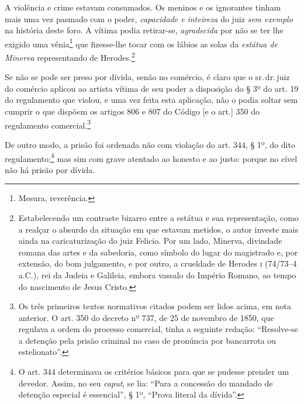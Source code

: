 A violência e crime estavam consumados. Os meninos e os ignorantes
tinham mais uma vez pasmado com o poder, \emph{capacidade e}
\emph{inteireza} do juiz \emph{sem exemplo} na história deste foro. A
vítima podia retirar-se, \emph{agradecida} por não se ter lhe exigido
uma vênia\footnote{ Mesura, reverência.} que fizesse-lhe tocar com os
lábios as solas da \emph{estátua de Minerva} representando de
Herodes.\footnote{ Estabelecendo um contraste bizarro entre a estátua e
  sua representação, como a realçar o absurdo da situação em que estavam
  metidos, o autor investe mais ainda na caricaturização do juiz
  Felicio. Por um lado, Minerva, divindade romana das artes e da
  sabedoria, como símbolo do lugar do magistrado e, por extensão, do bom
  julgamento, e por outro, a crueldade de Herodes \textsc{i} (74/73--4\,
  a.C.), rei da Judeia e Galileia, embora vassalo do Império Romano, ao
  tempo do nascimento de Jesus Cristo.}

Se não se pode ser preso por dívida, senão no comércio, é claro que o
sr.\,dr.\,juiz do comércio aplicou ao artista vítima de seu poder a
disposição do § 3º do art. 19 do regulamento que violou, e uma vez feita
esta aplicação, não o podia soltar sem cumprir o que dispõem os artigos
806 e 807 do Código {[}e o art.{]} 350 do regulamento
comercial.\footnote{ Os três primeiros textos normativos citados podem
  ser lidos acima, em nota anterior. O art. 350 do decreto nº 737, de
  25 de novembro de 1850, que regulava a ordem do processo comercial, tinha a
  seguinte redação: ``Resolve-se a detenção pela prisão criminal no caso
  de pronúncia por bancarrota ou estelionato''.}

De outro modo, a prisão foi ordenada não com violação do art. 344, § 1º,
do dito regulamento;\footnote{ O art. 344 determinava os critérios
  básicos para que se pudesse prender um devedor. Assim, no seu
  \emph{caput}, se lia: ``Para a concessão do mandado de detenção
  especial é essencial'', § 1º, ``Prova literal da dívida''.} mas sim com
grave atentado ao honesto e ao justo: porque no cível não há prisão por
dívida.

